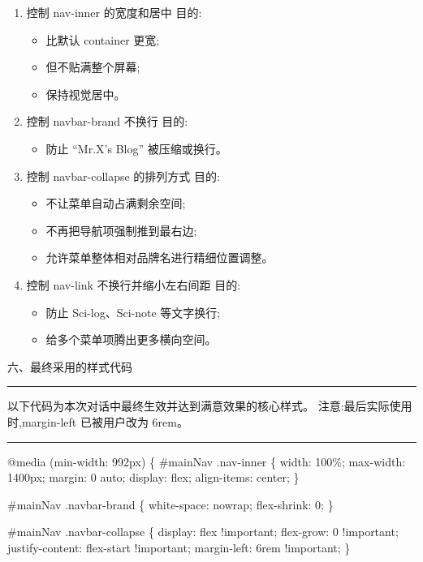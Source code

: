 \documentclass[lang=cn,scheme=chinese,color=blue,device=normal,toc=onecol,math=cm]{elegantbook}
\begin{document}
\begin{enumerate}
\item 控制 nav-inner 的宽度和居中 目的: 
\begin{itemize}
\item 比默认 container 更宽;
\item 但不贴满整个屏幕;
\item 保持视觉居中。
\end{itemize}
\item 控制 navbar-brand 不换行 目的: 
\begin{itemize}
\item 防止 “Mr.X’s Blog” 被压缩或换行。
\end{itemize}
\item 控制 navbar-collapse 的排列方式 目的: 
\begin{itemize}
\item 不让菜单自动占满剩余空间;
\item 不再把导航项强制推到最右边;
\item 允许菜单整体相对品牌名进行精细位置调整。
\end{itemize}
\item 控制 nav-link 不换行并缩小左右间距 目的: 
\begin{itemize}
\item 防止 Sci-log、Sci-note 等文字换行;
\item 给多个菜单项腾出更多横向空间。
\end{itemize}
\end{enumerate}


六、最终采用的样式代码\par


\medskip\hrule\medskip


以下代码为本次对话中最终生效并达到满意效果的核心样式。 注意:最后实际使用时,margin-left 已被用户改为 6rem。\par


\medskip\hrule\medskip


@media (min-width: 992px) \{ \#mainNav .nav-inner \{ width: 100\%; max-width: 1400px; margin: 0 auto; display: flex; align-items: center; \}\par


\#mainNav .navbar-brand \{ white-space: nowrap; flex-shrink: 0; \}\par


\#mainNav .navbar-collapse \{ display: flex !important; flex-grow: 0 !important; justify-content: flex-start !important; margin-left: 6rem !important; \}\par
\end{document}
